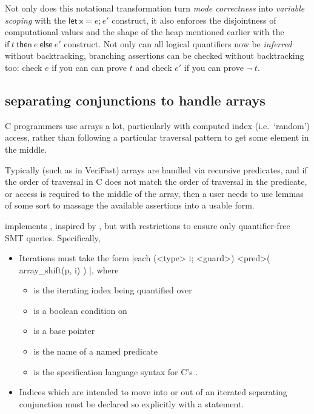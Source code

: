 Not only does this notational transformation turn \emph{mode correctness} into
\emph{variable scoping} with the $\mathsf{let\ x} = e; e'$ construct, it also
enforces the disjointness of computational values and the shape of the heap
mentioned earlier with the $\mathsf{if}\ t\ \mathsf{then}\ e\ \mathsf{else}\
e'$ construct. Not only can all logical quantifiers now be \emph{inferred}
without backtracking, branching assertions can be checked without backtracking
too: check $e$ if you can can prove $t$ and check $e'$ if you can prove
$\neg\;t$.

\subsection{ separating conjunctions to handle arrays}\label{sec:it-array}

C programmers use arrays a lot, particularly with computed index (i.e.\
`random') access, rather than following a particular traversal pattern to get
some element in the middle.

Typically (such as in VeriFast) arrays are handled via recursive predicates,
and if the order of traversal in C does not match the order of traversal in the
predicate, or access is required to the middle of the array, then a user needs
to use lemmas of some sort to massage the available assertions into a usable
form.

 implements , inspired by
, but with restrictions to ensure only
quantifier-free SMT queries. Specifically,
\begin{itemize}
    \item Iterations must take the form
        \cninline[breaklines]|each (<type> i; <guard>) { <pred>( array_shift(p, i) ) }|, %
        where
        \begin{itemize}
            \item {} is the iterating index being quantified over
            \item {} is a boolean condition on 
            \item \cninline{p} is a base pointer
            \item \cninline{<pred>} is the name of a named predicate
            \item \cninline{array_shift} is the specification language syntax
                for C's \cinline{p + i}.
        \end{itemize}
    \item Indices which are intended to move into or out of an iterated separating
        conjunction must be declared so explicitly with a 
        statement.
\end{itemize}

